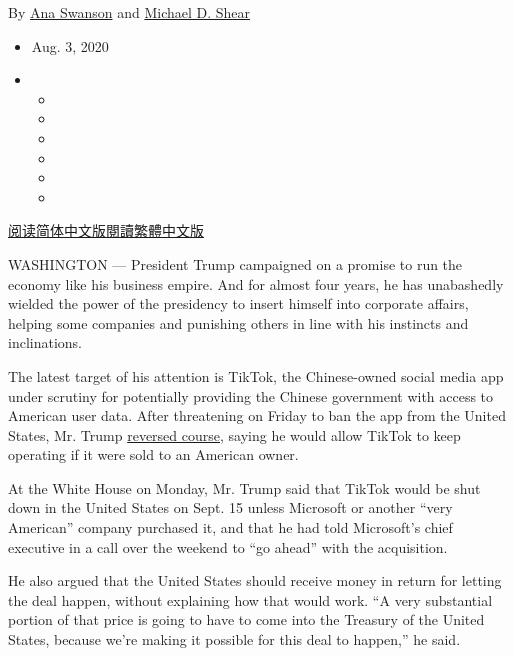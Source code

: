 By \href{https://www.nytimes3xbfgragh.onion/by/ana-swanson}{Ana Swanson}
and \href{https://www.nytimes3xbfgragh.onion/by/michael-d-shear}{Michael
D. Shear}

\begin{itemize}
\item
  Aug. 3, 2020
\item
  \begin{itemize}
  \item
  \item
  \item
  \item
  \item
  \item
  \end{itemize}
\end{itemize}

\href{https://cn.nytimes3xbfgragh.onion/business/20200804/trump-tiktok-china-business/}{阅读简体中文版}\href{https://cn.nytimes3xbfgragh.onion/business/20200804/trump-tiktok-china-business/zh-hant/}{閱讀繁體中文版}

WASHINGTON --- President Trump campaigned on a promise to run the
economy like his business empire. And for almost four years, he has
unabashedly wielded the power of the presidency to insert himself into
corporate affairs, helping some companies and punishing others in line
with his instincts and inclinations.

The latest target of his attention is TikTok, the Chinese-owned social
media app under scrutiny for potentially providing the Chinese
government with access to American user data. After threatening on
Friday to ban the app from the United States, Mr. Trump
\href{https://www.nytimes3xbfgragh.onion/2020/08/03/technology/trump-tiktok-microsoft.html}{reversed
course}, saying he would allow TikTok to keep operating if it were sold
to an American owner.

At the White House on Monday, Mr. Trump said that TikTok would be shut
down in the United States on Sept. 15 unless Microsoft or another ``very
American'' company purchased it, and that he had told Microsoft's chief
executive in a call over the weekend to ``go ahead'' with the
acquisition.

He also argued that the United States should receive money in return for
letting the deal happen, without explaining how that would work. ``A
very substantial portion of that price is going to have to come into the
Treasury of the United States, because we're making it possible for this
deal to happen,'' he said.

